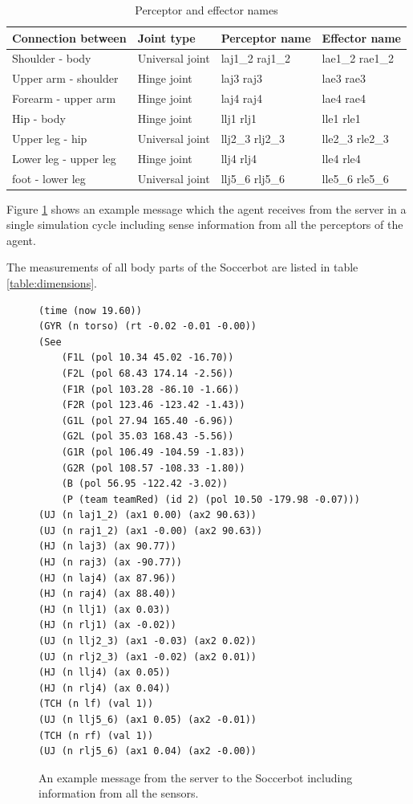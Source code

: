 \begin{table}
\caption{Perceptor and effector names}
\label{table:perceptorNames}
\begin{center}
\begin{tabular}{|l|l|l|l|}
\hline
{\bf Connection between}  & {\bf Joint type} & {\bf Perceptor name}& {\bf
Effector name} \\
\hline\hline
Shoulder - body  & Universal joint & laj1\_2  raj1\_2 & lae1\_2   rae1\_2 \\
\hline
Upper arm - shoulder  & Hinge joint & laj3  raj3 & lae3   rae3 \\
\hline
Forearm - upper arm  & Hinge joint & laj4  raj4 & lae4   rae4 \\
\hline
Hip - body  & Hinge joint & llj1  rlj1 & lle1   rle1 \\
\hline
Upper leg - hip & Universal joint & llj2\_3  rlj2\_3 & lle2\_3   rle2\_3 \\
\hline
Lower leg - upper leg & Hinge joint & llj4  rlj4 & lle4   rle4 \\
\hline
foot - lower leg & Universal joint & llj5\_6  rlj5\_6 & lle5\_6   rle5\_6 \\
\hline
\end{tabular}
\end{center}
\end{table}

Figure \ref{fig:examplemsg} shows an example message which the agent receives
from the server in a single simulation cycle including sense information from
all the perceptors of the agent.

The measurements of all body parts of the Soccerbot are listed in table
\ref{table:dimensions}.

\begin{figure}[h!]
 \centering
\lstset{language=SSML}
\begin{lstlisting}
(time (now 19.60))
(GYR (n torso) (rt -0.02 -0.01 -0.00))
(See
    (F1L (pol 10.34 45.02 -16.70))
    (F2L (pol 68.43 174.14 -2.56))
    (F1R (pol 103.28 -86.10 -1.66))
    (F2R (pol 123.46 -123.42 -1.43))
    (G1L (pol 27.94 165.40 -6.96))
    (G2L (pol 35.03 168.43 -5.56))
    (G1R (pol 106.49 -104.59 -1.83))
    (G2R (pol 108.57 -108.33 -1.80))
    (B (pol 56.95 -122.42 -3.02))
    (P (team teamRed) (id 2) (pol 10.50 -179.98 -0.07)))
(UJ (n laj1_2) (ax1 0.00) (ax2 90.63))
(UJ (n raj1_2) (ax1 -0.00) (ax2 90.63))
(HJ (n laj3) (ax 90.77))
(HJ (n raj3) (ax -90.77))
(HJ (n laj4) (ax 87.96))
(HJ (n raj4) (ax 88.40))
(HJ (n llj1) (ax 0.03))
(HJ (n rlj1) (ax -0.02))
(UJ (n llj2_3) (ax1 -0.03) (ax2 0.02))
(UJ (n rlj2_3) (ax1 -0.02) (ax2 0.01))
(HJ (n llj4) (ax 0.05))
(HJ (n rlj4) (ax 0.04))
(TCH (n lf) (val 1))
(UJ (n llj5_6) (ax1 0.05) (ax2 -0.01))
(TCH (n rf) (val 1))
(UJ (n rlj5_6) (ax1 0.04) (ax2 -0.00))
\end{lstlisting}
 \caption{An example message from the server to the Soccerbot including information from all the sensors.}
 \label{fig:examplemsg}
\end{figure}


